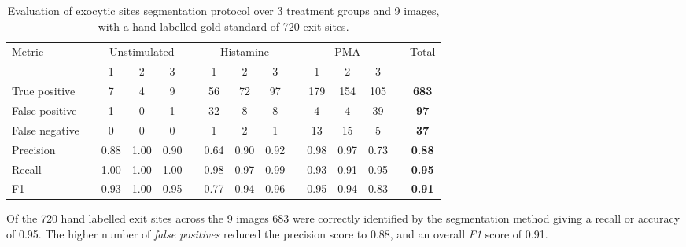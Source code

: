 \begin{table}[htbp!]
\footnotesize
\caption[Exocytic sites segmentation evaluation]{Evaluation of exocytic sites segmentation protocol over 3 treatment groups and 9 images, with a hand-labelled gold standard of 720 exit sites.}
\centering
\label{table:endothelial_morphometry:exocytic_sites_performance}
\begin{tabular}{l c c c c c c c c c c c c c >{\bfseries}c}
\toprule
\multirow{2}{*}{Metric} & & \multicolumn{3}{c}{Unstimulated} & & \multicolumn{3}{c}{Histamine} & & \multicolumn{3}{c}{PMA} & & \multirow{2}{*}{Total} \\
\cmidrule{3-5}
\cmidrule{7-9}
\cmidrule{11-13}
	& & 1 & 2 & 3 & & 1 & 2 & 3 & & 1 & 2 & 3 & &\\
\midrule
	True positive  & & 7 & 4 & 9 & & 56 & 72 & 97 & & 179 & 154 & 105 & & 683 \\
	False positive & & 1 & 0 & 1 & & 32 & 8  & 8  & & 4   & 4   & 39  & & 97  \\
	False negative & & 0 & 0 & 0 & & 1  & 2  & 1  & & 13  & 15  & 5   & & 37  \\
\midrule
	Precision      & & 0.88 & 1.00 & 0.90 & & 0.64 & 0.90 & 0.92 & & 0.98 & 0.97 & 0.73 & & 0.88 \\
	Recall         & & 1.00 & 1.00 & 1.00 & & 0.98 & 0.97 & 0.99 & & 0.93 & 0.91 & 0.95 & & 0.95 \\
	F1             & & 0.93 & 1.00 & 0.95 & & 0.77 & 0.94 & 0.96 & & 0.95 & 0.94 & 0.83 & & 0.91 \\
\bottomrule
\end{tabular}
\end{table}

Of the 720 hand labelled exit sites across the 9 images 683 were correctly identified by the segmentation method giving a recall or accuracy of 0.95. The higher number of \emph{false positives} reduced the precision score to 0.88, and an overall \emph{F1} score of 0.91.

